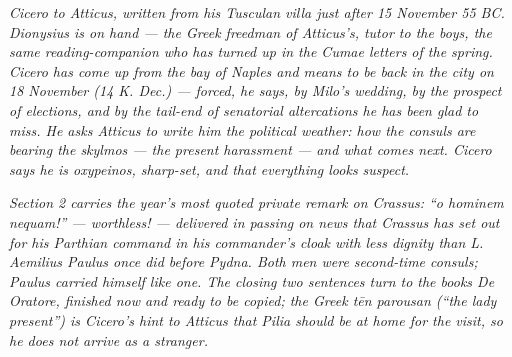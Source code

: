 
\textit{Cicero to Atticus, written from his Tusculan villa just after
15 November 55 BC. Dionysius is on hand --- the Greek freedman of
Atticus's, tutor to the boys, the same reading-companion who has
turned up in the Cumae letters of the spring. Cicero has come up
from the bay of Naples and means to be back in the city on 18
November (14 K. Dec.) --- forced, he says, by Milo's wedding, by
the prospect of elections, and by the tail-end of senatorial
altercations he has been glad to miss. He asks Atticus to write him
the political weather: how the consuls are bearing the
\textit{skylmos} --- the present harassment --- and what comes
next. Cicero says he is \textit{oxypeinos}, sharp-set, and that
everything looks suspect.}

\textit{Section 2 carries the year's most quoted private remark on
Crassus: ``\textit{o hominem nequam!}'' --- worthless! ---
delivered in passing on news that Crassus has set out for his
Parthian command in his commander's cloak with less dignity than
L. Aemilius Paulus once did before Pydna. Both men were second-time
consuls; Paulus carried himself like one. The closing two
sentences turn to the books \textit{De Oratore}, finished now and
ready to be copied; the Greek \textit{tēn parousan} (``the lady
present'') is Cicero's hint to Atticus that Pilia should be at
home for the visit, so he does not arrive as a stranger.}
